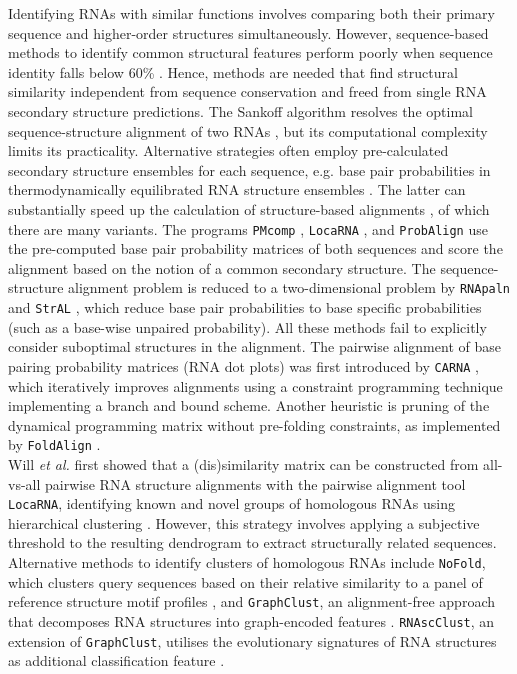 \documentclass{bmcart}
\newcommand\graphclust{\texttt{GraphClust}}
\newcommand\locarna{\texttt{LocaRNA}}
\newcommand\carna{\texttt{CARNA}}
\begin{document}
Identifying RNAs with similar functions involves comparing both their primary
sequence and higher-order structures simultaneously. However, sequence-based 
methods to identify common structural features perform poorly when sequence 
identity falls below 60\%  \cite{Gardner15860779}. Hence, methods are needed
that find structural similarity independent from sequence conservation and
freed from single RNA secondary structure predictions. The Sankoff algorithm
resolves the optimal sequence-structure alignment of two RNAs \cite{sankoff85},
but its computational complexity limits its practicality. Alternative
strategies often employ pre-calculated secondary structure ensembles for each
sequence, e.g. base pair probabilities in thermodynamically equilibrated RNA
structure ensembles \cite{McCaskill:1990}. The latter can substantially speed
up the calculation of structure-based alignments \cite{Hofacker15073017}, of
which there are many variants.  The programs \texttt{PMcomp} \cite{Hofacker15073017},
\locarna{} \cite{Will17432929}, and \texttt{ProbAlign} \cite{Roshan16954142} use the pre-computed
base pair probability matrices of both sequences and score the alignment based
on the notion of a common secondary structure. The sequence-structure alignment
problem is reduced to a two-dimensional problem by \texttt{RNApaln} \cite{Lorenz22115189} and
\texttt{StrAL} \cite{Dalli16613908}, which reduce base pair probabilities to base
specific probabilities (such as a base-wise unpaired probability). All these methods fail 
to explicitly consider suboptimal structures in the alignment. The pairwise
alignment of base pairing probability matrices (RNA dot plots) was first introduced 
by \carna{} \cite{Palu2010,Sorescu2012}, which iteratively improves alignments using a constraint programming technique implementing a branch and bound scheme. 
Another heuristic is pruning of the dynamical programming matrix without pre-folding constraints, as implemented by \texttt{FoldAlign} \cite{Havgaard17937495,Sundfeld26704597}. \\ 

Will \textit{et al.} \nocite{Will17432929} first showed that a (dis)similarity matrix can be constructed from all-vs-all pairwise RNA structure alignments with the pairwise alignment tool \locarna{}, identifying known and novel groups of homologous RNAs using hierarchical clustering \cite{Will17432929}. However, this strategy involves applying a subjective threshold to the resulting dendrogram to extract structurally related sequences. Alternative methods to identify clusters of homologous RNAs include \texttt{NoFold}, which clusters query sequences based on their relative similarity to a panel of reference structure motif profiles \cite{Middleton25234928}, and \graphclust{}, an alignment-free approach that decomposes RNA structures into graph-encoded features \cite{Heyne22689765}. \texttt{RNAscClust}, an extension of \graphclust{}, utilises the evolutionary signatures of RNA structures as additional classification feature \cite{Miladi28334186}. \\
\end{document}
